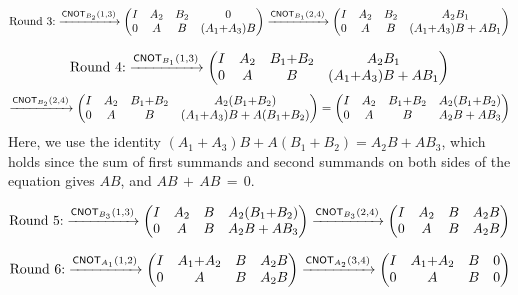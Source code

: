 \documentclass{article}
\begin{document}
\[
\text{Round~3:}
\xrightarrow{\mathsf{CNOT}_{B_2}(1,3)}
\begin{pmatrix}
I & A_2 & B_2 & 0 \\
0 & A & B & (A_1{+}A_3)B
\end{pmatrix}
\xrightarrow{\mathsf{CNOT}_{B_1}(2,4)}
\begin{pmatrix}
I & A_2 & B_2 & A_2B_1 \\
0 & A & B & (A_1{+}A_3)B+AB_1 \\
\end{pmatrix}
\]

\[
\text{Round~4:}
\xrightarrow{\mathsf{CNOT}_{B_1}(1,3)}
\begin{pmatrix}
I & A_2 & B_1{+}B_2 & A_2 B_1 \\
0 & A & B & (A_1{+}A_3)B + AB_1 \\
\end{pmatrix}
\]
\[
\xrightarrow{\mathsf{CNOT}_{B_2}(2,4)}
\begin{pmatrix}
I & A_2 & B_1{+}B_2 & A_2 (B_1{+}B_2) \\
0 & A & B & (A_1{+}A_3)B+A(B_1{+}B_2) \\
\end{pmatrix}
=
\begin{pmatrix}
I & A_2 & B_1{+}B_2 & A_2 (B_1{+}B_2) \\
0 & A & B & A_2B + AB_3 \\
\end{pmatrix}
\]
Here, we use the identity $(A_1{+}A_3)B+A(B_1{+}B_2)=A_2B + AB_3$, which holds since the sum of first summands and second summands on both sides of the equation gives $AB$, and $AB\,{+}\,AB\,{=}\,0$.

\[
\text{Round~5:}
\xrightarrow{\mathsf{CNOT}_{B_3}(1,3)}
\begin{pmatrix}
I & A_2 & B & A_2 (B_1{+}B_2) \\
0 & A & B & A_2B + AB_3  \\
\end{pmatrix}
\xrightarrow{\mathsf{CNOT}_{B_3}(2,4)}
\begin{pmatrix}
I & A_2 & B & A_2 B \\
0 & A & B & A_2B   \\
\end{pmatrix}
\]

\[
\text{Round~6:}
\xrightarrow{\mathsf{CNOT}_{A_1}(1,2)}
\begin{pmatrix}
I & A_1{+}A_2 & B & A_2 B \\
0 & A & B & A_2B   \\
\end{pmatrix}
\xrightarrow{\mathsf{CNOT}_{A_2}(3,4)}
\begin{pmatrix}
I & A_1{+}A_2 & B & 0 \\
0 & A & B & 0  \\
\end{pmatrix}
\]
\end{document}
